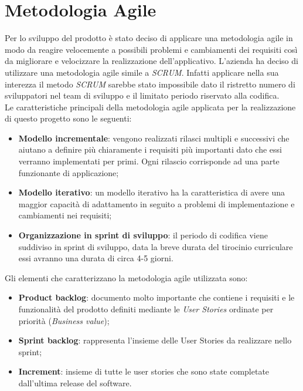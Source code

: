 \section{Metodologia Agile}
Per lo sviluppo del prodotto è stato deciso di applicare una metodologia agile in modo da reagire velocemente a possibili problemi e cambiamenti dei requisiti così da migliorare e velocizzare la realizzazione dell'applicativo. L'azienda ha deciso di utilizzare una metodologia agile simile a \emph{SCRUM}\glo. Infatti applicare nella sua interezza il metodo \emph{SCRUM} sarebbe stato impossibile dato il ristretto numero di sviluppatori nel team di sviluppo e il limitato periodo riservato alla codifica. \\
Le caratteristiche principali della metodologia agile applicata per la realizzazione di questo progetto sono le seguenti:
\begin{itemize}
	\item \textbf{Modello incrementale}: vengono realizzati rilasci multipli e successivi che aiutano a definire più chiaramente i requisiti più importanti dato che essi verranno implementati per primi. Ogni rilascio corrisponde ad una parte funzionante di applicazione;
	
	\item \textbf{Modello iterativo}: un modello iterativo ha la caratteristica di avere una maggior capacità di adattamento in seguito a problemi di implementazione e cambiamenti nei requisiti;
	
	\item \textbf{Organizzazione in sprint di sviluppo}: il periodo di codifica viene suddiviso in sprint di sviluppo, data la breve durata del tirocinio curriculare essi avranno una durata di circa 4-5 giorni.
\end{itemize}
\noindent
Gli elementi che caratterizzano la metodologia agile utilizzata sono:
\begin{itemize}
	\item \textbf{Product backlog}: documento molto importante che contiene i requisiti e le funzionalità del prodotto definiti mediante le \emph{User Stories} ordinate per priorità (\emph{Business value});
	
	\item \textbf{Sprint backlog}: rappresenta l'insieme delle User Stories da realizzare nello sprint;
	
	\item \textbf{Increment}: insieme di tutte le user stories che sono state completate dall'ultima release del software.
\end{itemize}
